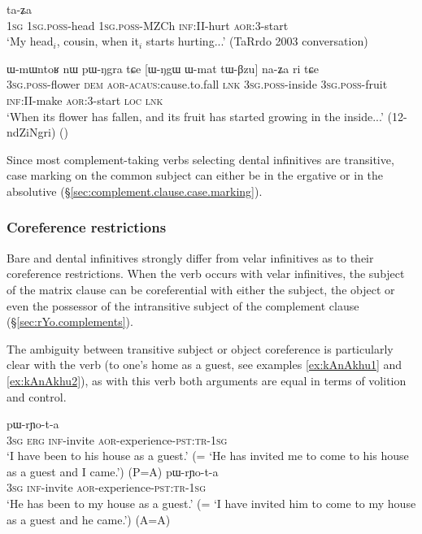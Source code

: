 \begin{exe} 
\ex \label{ex:tWmNAm.taZa}
 ta-ʑa \\
\textsc{1sg} \textsc{1sg}.\textsc{poss}-head \textsc{1sg}.\textsc{poss}-MZCh \textsc{inf}:II-hurt \textsc{aor}:3\flobv{}-start \\
\glt `My head$_i$, cousin, when it$_i$ starts hurting...' (TaRrdo 2003 conversation)
  \end{exe} 
  
\begin{exe} 
\ex \label{ex:Wmat.tWBzu.naZa}
\gll ɯ-mɯntoʁ nɯ pɯ-ŋgra tɕe [ɯ-ŋgɯ ɯ-mat tɯ-βzu] na-ʑa ri tɕe \\
\textsc{3sg}.\textsc{poss}-flower \textsc{dem} \textsc{aor}-\textsc{acaus}:cause.to.fall \textsc{lnk} \textsc{3sg}.\textsc{poss}-inside \textsc{3sg}.\textsc{poss}-fruit \textsc{inf}:II-make \textsc{aor}:3\flobv{}-start \textsc{loc} \textsc{lnk} \\
\glt `When its flower has fallen, and its fruit has started growing in the inside...' (12-ndZiNgri)
()
 \end{exe} 
 
Since most complement-taking verbs selecting dental infinitives are transitive, case marking on the common subject can either be in the ergative or in the absolutive (§\ref{sec:complement.clause.case.marking}).

\subsubsection{Coreference restrictions} \label{sec:bare.inf.coreference}
Bare and dental infinitives strongly differ from velar infinitives as to their coreference restrictions. When the verb  occurs with velar infinitives, the subject of the matrix clause can be coreferential with either the subject, the object or even the possessor of the intransitive subject of the complement clause (§\ref{sec:rYo.complements}).

The ambiguity between transitive subject or object coreference is particularly clear with the verb  (to one's home as a guest, see examples \ref{ex:kAnAkhu1} and \ref{ex:kAnAkhu2}), as with this verb both arguments are equal in terms of volition and control.

\begin{exe}
\ex  \label{ex:kAnAkhu1}
 pɯ-rɲo-t-a  \\
\textsc{3sg} \textsc{erg} \textsc{inf}-invite \textsc{aor}-experience-\textsc{pst}:\textsc{tr}-\textsc{1sg} \\
\glt `I have been to his house as a guest.'  (= `He has invited me to come to his house as a guest and I came.') (P=A)
\ex  \label{ex:kAnAkhu2}
 pɯ-rɲo-t-a  \\
\textsc{3sg}  \textsc{inf}-invite \textsc{aor}-experience-\textsc{pst}:\textsc{tr}-\textsc{1sg} \\
\glt `He has been to my house as a guest.' (= `I have invited him to come to my house as a guest and he came.') (A=A)
\end{exe}

